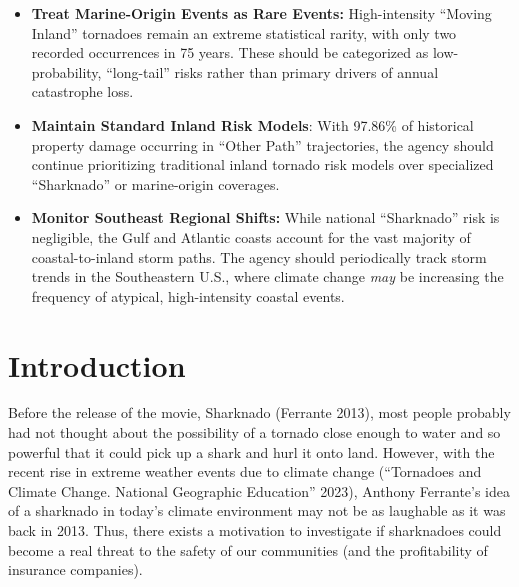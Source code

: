 \documentclass[
  letterpaper,
  DIV=11,
  numbers=noendperiod]{scrreprt}
\providecommand{\tightlist}{%
  \setlength{\itemsep}{0pt}\setlength{\parskip}{0pt}}
\begin{document}
\begin{tcolorbox}[enhanced jigsaw, bottomrule=.15mm, colframe=quarto-callout-tip-color-frame, colback=white, opacityback=0, toptitle=1mm, leftrule=.75mm, arc=.35mm, title=\textcolor{quarto-callout-tip-color}{\faLightbulb}\hspace{0.5em}{Reccome}, bottomtitle=1mm, colbacktitle=quarto-callout-tip-color!10!white, coltitle=black, breakable, titlerule=0mm, opacitybacktitle=0.6, rightrule=.15mm, toprule=.15mm, left=2mm]

\begin{itemize}
\tightlist
\item
  \textbf{Treat Marine-Origin Events as Rare Events:} High-intensity
  ``Moving Inland'' tornadoes remain an extreme statistical rarity, with
  only two recorded occurrences in 75 years. These should be categorized
  as low-probability, ``long-tail'' risks rather than primary drivers of
  annual catastrophe loss.
\item
  \textbf{Maintain Standard Inland Risk Models}: With 97.86\% of
  historical property damage occurring in ``Other Path'' trajectories,
  the agency should continue prioritizing traditional inland tornado
  risk models over specialized ``Sharknado'' or marine-origin coverages.
\item
  \textbf{Monitor Southeast Regional Shifts:} While national
  ``Sharknado'' risk is negligible, the Gulf and Atlantic coasts account
  for the vast majority of coastal-to-inland storm paths. The agency
  should periodically track storm trends in the Southeastern U.S., where
  climate change \emph{may} be increasing the frequency of atypical,
  high-intensity coastal events.
\end{itemize}

\end{tcolorbox}


\chapter{Introduction}\label{sec-introduction}

Before the release of the movie, Sharknado (Ferrante 2013), most people
probably had not thought about the possibility of a tornado close enough
to water and so powerful that it could pick up a shark and hurl it onto
land. However, with the recent rise in extreme weather events due to
climate change ({``Tornadoes and Climate Change. National Geographic
Education''} 2023), Anthony Ferrante's idea of a sharknado in today's
climate environment may not be as laughable as it was back in 2013.
Thus, there exists a motivation to investigate if sharknadoes could
become a real threat to the safety of our communities (and the
profitability of insurance companies).
\end{document}
